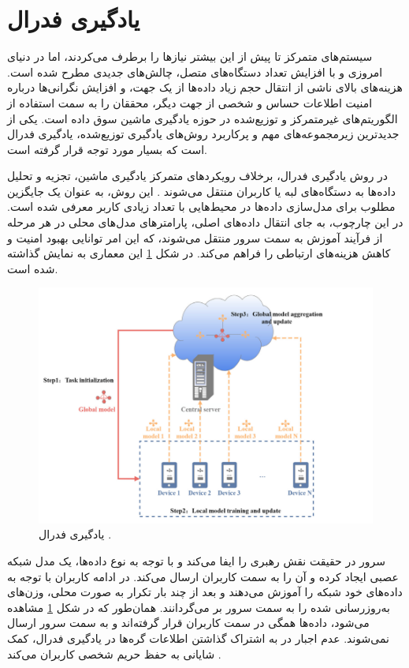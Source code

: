 \section{
	یادگیری فدرال%
}
سیستم‌های متمرکز تا پیش از این بیشتر نیازها را برطرف می‌کردند، اما در دنیای امروزی و با افزایش تعداد دستگاه‌های متصل، چالش‌های جدیدی مطرح شده است. هزینه‌های بالای ناشی از انتقال حجم زیاد داده‌ها از یک جهت، و افزایش نگرانی‌ها درباره امنیت اطلاعات حساس و شخصی از جهت دیگر، محققان را به سمت استفاده از الگوریتم‌های غیرمتمرکز و توزیع‌شده در حوزه یادگیری ماشین سوق داده است. یکی از جدیدترین زیرمجموعه‌های مهم و پرکاربرد روش‌های یادگیری توزیع‌شده، یادگیری فدرال است که بسیار مورد توجه قرار گرفته است.


در روش یادگیری فدرال، برخلاف رویکردهای متمرکز یادگیری ماشین، تجزیه و تحلیل داده‌ها به دستگاه‌های لبه%
یا کاربران%
منتقل می‌شوند
\cite{ma2022state}.
این روش، به عنوان یک جایگزین مطلوب برای مدل‌سازی داده‌ها در محیط‌هایی با تعداد زیادی کاربر معرفی شده است. در این چارچوب، به جای انتقال داده‌های اصلی، پارامترهای مدل‌های محلی در هر مرحله از فرآیند آموزش به سمت سرور منتقل می‌شوند، که این امر توانایی بهبود امنیت و کاهش هزینه‌های ارتباطی را فراهم می‌کند.
در شکل
\ref{federated_learning}
این معماری به نمایش گذاشته شده است.


 \begin{figure}[t]
	\centering
	\includegraphics[scale=0.7]{images/chap1/federated_learning.png}%
	\caption{%
		یادگیری فدرال 
		\cite{ma2022state}%
		.
	}
	\label{federated_learning}
	\centering
\end{figure}

سرور در حقیقت نقش رهبری را ایفا می‌کند و با توجه به نوع داده‌ها، یک مدل شبکه عصبی%
ایجاد کرده و آن را به سمت کاربران ارسال می‌کند. در ادامه کاربران با توجه به داده‌های خود شبکه را آموزش می‌دهند و بعد از چند بار تکرار به صورت محلی، وزن‌های به‌روزرسانی شده را به سمت سرور بر می‌گردانند. همان‌طور که در شکل
\ref{federated_learning}
مشاهده می‌شود، داده‌ها همگی در سمت کاربران قرار گرفته‌اند و به سمت سرور ارسال نمی‌شوند. عدم اجبار در به اشتراک گذاشتن اطلاعات گره‌ها در یادگیری فدرال، کمک شایانی به حفظ حریم شخصی کاربران می‌کند
\cite{smith2017federated}.





